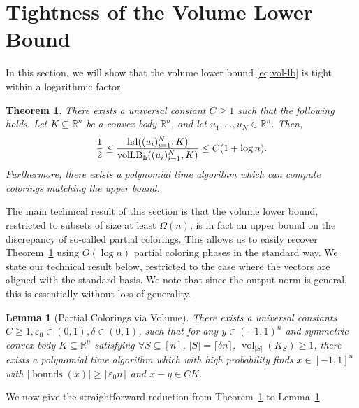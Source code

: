 \documentclass[12pt]{article}
\newtheorem{theorem}{Theorem}
\newtheorem{lemma}{Lemma}
\newcommand{\ceil}[1]{\lceil #1 \rceil}
\newcommand{\R}{{\mathbb{R}}}
\newcommand\eps{\varepsilon}
\DeclareMathOperator{\vollb}{volLB}
\DeclareMathOperator{\hd}{hd}
\DeclareMathOperator{\vol}{vol}
\DeclareMathOperator{\bnds}{bounds}
\begin{document}
\section{Tightness of the Volume Lower Bound}

In this section, we will show that the volume lower bound \eqref{eq:vol-lb} is
tight within a logarithmic factor. 

\begin{theorem}\label{thm:tightness}
There exists a universal constant $C \geq 1$ such that the following
holds. Let $K \subseteq \R^n$ be a convex body $\R^n$, and let $u_1,
\ldots, u_N \in \R^n$. Then,
\[
\frac{1}{2} \le \frac{\hd((u_i)_{i = 1}^N, K)}{\vollb_{\rm h}((u_i)_{i = 1}^N, K) } \le C(1+\log n).
\]
Furthermore, there exists a polynomial time algorithm which can compute
colorings matching the upper bound. 
\end{theorem}

The main technical result of this section is that the volume lower bound,
restricted to subsets of size at least $\Omega(n)$, is in fact an upper bound on
the discrepancy of so-called partial colorings. This allows us to easily recover
Theorem~\ref{thm:tightness} using $O(\log n)$ partial coloring phases in the
standard way. We state our technical result below, restricted to the case where
the vectors are aligned with the standard basis. We note that since the output
norm is general, this is essentially without loss of generality. 

\begin{lemma}[Partial Colorings via Volume] \label{lem:partial-via-volume}
There exists a universal constants $C \geq 1, \eps_0 \in (0,1), \delta \in (0,1)$, such that
for any $y \in (-1,1)^n$ and symmetric convex body $K \subseteq \R^n$ satisfying
$\forall S \subseteq [n]$, $|S| = \ceil{\delta n}$, $\vol_{|S|}(K_S) \geq 1$, there
exists a polynomial time algorithm which with high probability finds $x \in
[-1,1]^n$ with $|\bnds(x)| \geq \ceil{\eps_0 n}$ and
$x-y \in C K$.  
\end{lemma}

We now give the straightforward reduction from Theorem~\ref{thm:tightness} to
Lemma~\ref{lem:partial-via-volume}.
\end{document}

